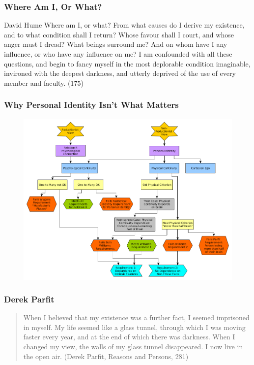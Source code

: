 \documentclass[xcolor=dvipsnames]{beamer}
\begin{document}
\begin{frame}
  \frametitle{Where Am I, Or What?}
  \begin{block}{David Hume}
    Where am I, or what? From what causes do I derive my
    existence, and to what condition shall I return? Whose favour
    shall I court, and whose anger must I dread? What beings
    surround me? And on whom have I any influence, or who have
    any influence on me? I am confounded with all these questions,
    and begin to fancy myself in the most deplorable condition
    imaginable, invironed with the deepest darkness, and utterly
    deprived of the use of every member and faculty. (175)
  \end{block}
\end{frame}

\begin{frame}
  \frametitle{Why Personal Identity Isn't What Matters}
  \begin{figure}[h]
    \includegraphics[scale=0.3]{./parfit.png}
  \end{figure}
\end{frame}

\begin{frame}
  \frametitle{Derek Parfit}
  \begin{quote}
    When I believed that my existence was a further fact, I seemed
    imprisoned in myself. My life seemed like a glass tunnel, through
    which I was moving faster every year, and at the end of which
    there was darkness. When I changed my view, the walls of my glass
    tunnel disappeared. I now live in the open air. (Derek Parfit,
    Reasons and Persons, 281)
  \end{quote}
\end{frame}
\end{document}
